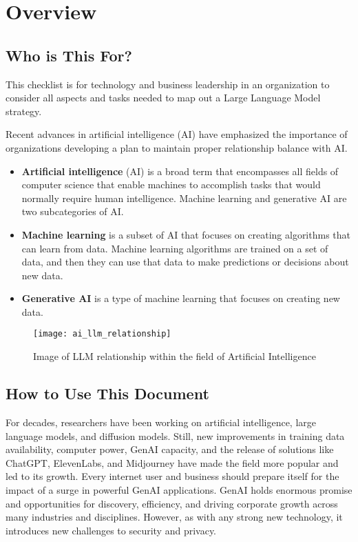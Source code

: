 

\headerimage
\chapter{Overview}

\section{Who is This For?}
This checklist is for technology and business leadership in an organization
to consider all aspects and tasks needed to map out a Large Language Model
strategy.

Recent advances in artificial intelligence (AI) have emphasized the importance
of organizations developing a plan to maintain proper relationship balance
with AI.

\begin{itemize}
  \item \textbf{Artificial intelligence} (AI) is a broad term that encompasses
  all fields of computer science that enable machines to accomplish tasks that
  would normally require human intelligence. Machine learning and generative AI
  are two subcategories of AI.
  \item \textbf{Machine learning} is a subset of AI that focuses on creating
  algorithms that can learn from data. Machine learning algorithms are trained
  on a set of data, and then they can use that data to make predictions or
  decisions about new data.
  \item \textbf{Generative AI} is a type of machine learning that focuses on
  creating new data.
\end{itemize}

\begin{figure}[h]
  \centering
  \texttt{[image: ai\_llm\_relationship]}
  \caption{Image of LLM relationship within the field of Artificial Intelligence}
  \label{fig:ai-llm-relationship}
\end{figure}

\section{How to Use This Document}

For decades, researchers have been working on artificial intelligence, large
language models, and diffusion models. Still, new improvements in training data
availability, computer power, GenAI capacity, and the release of solutions like
ChatGPT, ElevenLabs, and Midjourney have made the field more popular and led to
its growth. Every internet user and business should prepare itself for the
impact of a surge in powerful GenAI applications. GenAI holds enormous promise
and opportunities for discovery, efficiency, and driving corporate growth across
many industries and disciplines. However, as with any strong new technology, it
introduces new challenges to security and privacy.


